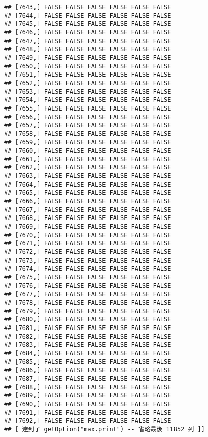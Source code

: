 \documentclass[
]{article}
\begin{document}
\begin{verbatim}
## [7643,] FALSE FALSE FALSE FALSE FALSE FALSE
## [7644,] FALSE FALSE FALSE FALSE FALSE FALSE
## [7645,] FALSE FALSE FALSE FALSE FALSE FALSE
## [7646,] FALSE FALSE FALSE FALSE FALSE FALSE
## [7647,] FALSE FALSE FALSE FALSE FALSE FALSE
## [7648,] FALSE FALSE FALSE FALSE FALSE FALSE
## [7649,] FALSE FALSE FALSE FALSE FALSE FALSE
## [7650,] FALSE FALSE FALSE FALSE FALSE FALSE
## [7651,] FALSE FALSE FALSE FALSE FALSE FALSE
## [7652,] FALSE FALSE FALSE FALSE FALSE FALSE
## [7653,] FALSE FALSE FALSE FALSE FALSE FALSE
## [7654,] FALSE FALSE FALSE FALSE FALSE FALSE
## [7655,] FALSE FALSE FALSE FALSE FALSE FALSE
## [7656,] FALSE FALSE FALSE FALSE FALSE FALSE
## [7657,] FALSE FALSE FALSE FALSE FALSE FALSE
## [7658,] FALSE FALSE FALSE FALSE FALSE FALSE
## [7659,] FALSE FALSE FALSE FALSE FALSE FALSE
## [7660,] FALSE FALSE FALSE FALSE FALSE FALSE
## [7661,] FALSE FALSE FALSE FALSE FALSE FALSE
## [7662,] FALSE FALSE FALSE FALSE FALSE FALSE
## [7663,] FALSE FALSE FALSE FALSE FALSE FALSE
## [7664,] FALSE FALSE FALSE FALSE FALSE FALSE
## [7665,] FALSE FALSE FALSE FALSE FALSE FALSE
## [7666,] FALSE FALSE FALSE FALSE FALSE FALSE
## [7667,] FALSE FALSE FALSE FALSE FALSE FALSE
## [7668,] FALSE FALSE FALSE FALSE FALSE FALSE
## [7669,] FALSE FALSE FALSE FALSE FALSE FALSE
## [7670,] FALSE FALSE FALSE FALSE FALSE FALSE
## [7671,] FALSE FALSE FALSE FALSE FALSE FALSE
## [7672,] FALSE FALSE FALSE FALSE FALSE FALSE
## [7673,] FALSE FALSE FALSE FALSE FALSE FALSE
## [7674,] FALSE FALSE FALSE FALSE FALSE FALSE
## [7675,] FALSE FALSE FALSE FALSE FALSE FALSE
## [7676,] FALSE FALSE FALSE FALSE FALSE FALSE
## [7677,] FALSE FALSE FALSE FALSE FALSE FALSE
## [7678,] FALSE FALSE FALSE FALSE FALSE FALSE
## [7679,] FALSE FALSE FALSE FALSE FALSE FALSE
## [7680,] FALSE FALSE FALSE FALSE FALSE FALSE
## [7681,] FALSE FALSE FALSE FALSE FALSE FALSE
## [7682,] FALSE FALSE FALSE FALSE FALSE FALSE
## [7683,] FALSE FALSE FALSE FALSE FALSE FALSE
## [7684,] FALSE FALSE FALSE FALSE FALSE FALSE
## [7685,] FALSE FALSE FALSE FALSE FALSE FALSE
## [7686,] FALSE FALSE FALSE FALSE FALSE FALSE
## [7687,] FALSE FALSE FALSE FALSE FALSE FALSE
## [7688,] FALSE FALSE FALSE FALSE FALSE FALSE
## [7689,] FALSE FALSE FALSE FALSE FALSE FALSE
## [7690,] FALSE FALSE FALSE FALSE FALSE FALSE
## [7691,] FALSE FALSE FALSE FALSE FALSE FALSE
## [7692,] FALSE FALSE FALSE FALSE FALSE FALSE
## [ 達到了 getOption("max.print") -- 省略最後 11852 列 ]]
\end{verbatim}
\end{document}
